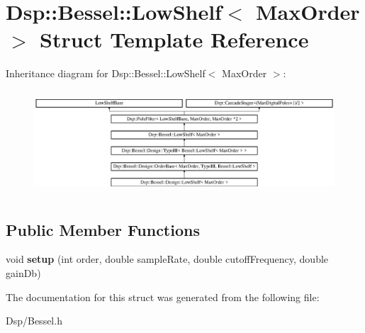 \hypertarget{structDsp_1_1Bessel_1_1LowShelf}{\section{Dsp\-:\-:Bessel\-:\-:Low\-Shelf$<$ Max\-Order $>$ Struct Template Reference}
\label{structDsp_1_1Bessel_1_1LowShelf}
}
Inheritance diagram for Dsp\-:\-:Bessel\-:\-:Low\-Shelf$<$ Max\-Order $>$\-:\begin{figure}[H]
\begin{center}
\leavevmode
\includegraphics[height=3.906977cm]{structDsp_1_1Bessel_1_1LowShelf}
\end{center}
\end{figure}
\subsection*{Public Member Functions}
\begin{DoxyCompactItemize}
\item 
\hypertarget{structDsp_1_1Bessel_1_1LowShelf_a6aeb6c174d0ce07a8df4c8113122d1aa}{void {\bfseries setup} (int order, double sample\-Rate, double cutoff\-Frequency, double gain\-Db)}\label{structDsp_1_1Bessel_1_1LowShelf_a6aeb6c174d0ce07a8df4c8113122d1aa}

\end{DoxyCompactItemize}


The documentation for this struct was generated from the following file\-:\begin{DoxyCompactItemize}
\item 
Dsp/Bessel.\-h\end{DoxyCompactItemize}
